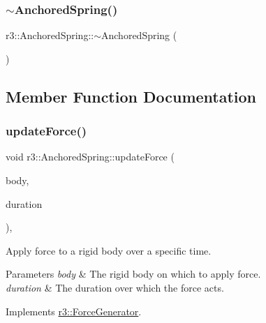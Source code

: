 \subsubsection{\texorpdfstring{$\sim$\+Anchored\+Spring()}{~AnchoredSpring()}}
{\footnotesize\ttfamily r3\+::\+Anchored\+Spring\+::$\sim$\+Anchored\+Spring (\begin{DoxyParamCaption}{ }\end{DoxyParamCaption})\hspace{0.3cm}{\ttfamily [default]}}



\subsection{Member Function Documentation}
\mbox{\label{classr3_1_1_anchored_spring_a3e928bc7fdedc8eb5b302a007200a58c}} 
\subsubsection{\texorpdfstring{update\+Force()}{updateForce()}}
{\footnotesize\ttfamily void r3\+::\+Anchored\+Spring\+::update\+Force (\begin{DoxyParamCaption}\item[{\mbox{\hyperlink{classr3_1_1_rigid_body}{Rigid\+Body}} $\ast$}]{body,  }\item[{\mbox{\hyperlink{namespacer3_ab2016b3e3f743fb735afce242f0dc1eb}{real}}}]{duration }\end{DoxyParamCaption})\hspace{0.3cm}{\ttfamily [override]}, {\ttfamily [virtual]}}



Apply force to a rigid body over a specific time. 


\begin{DoxyParams}{Parameters}
{\em body} & The rigid body on which to apply force. \\
\hline
{\em duration} & The duration over which the force acts. \\
\hline
\end{DoxyParams}


Implements \mbox{\hyperlink{classr3_1_1_force_generator_a69bebbde8cef792d6636af50037af2aa}{r3\+::\+Force\+Generator}}.



